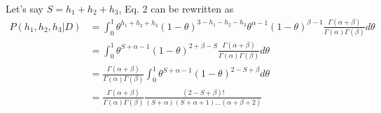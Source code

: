 \documentclass{article}
\begin{document}
Let's say $S=h_1+h_2+h_3$, Eq. 2 can be rewritten as
\begin{equation}
\begin{split}
P(h_1,h_2,h_3|D)&=\int_{0}^1 \theta^{h_1+h_2+h_3}(1-\theta)^{3-h_1-h_2-h_3}\theta^{\alpha-1}(1-\theta)^{\beta-1}\frac{\Gamma(\alpha+\beta)}{\Gamma(\alpha)\Gamma(\beta)}d\theta\\
&=\int_0^1\theta^{S+\alpha-1}(1-\theta)^{2+\beta-S}\frac{\Gamma(\alpha+\beta)}{\Gamma(\alpha)\Gamma(\beta)}d\theta\\
&=\frac{\Gamma(\alpha+\beta)}{\Gamma(\alpha)\Gamma(\beta)}\int_0^1\theta^{S+\alpha-1}(1-\theta)^{2-S+\beta}d\theta\\
&=\frac{\Gamma(\alpha+\beta)}{\Gamma(\alpha)\Gamma(\beta)}\frac{(2-S+\beta)!}{(S+\alpha)(S+\alpha+1)...(\alpha+\beta+2)}
\end{split}
\end{equation}\label{eqn:binbeta}
\end{document}
